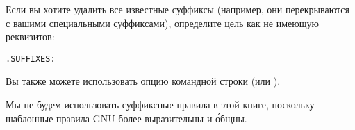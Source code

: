 Если вы хотите удалить все известные суффиксы (например, они
перекрываются с вашими специальными суффиксами), определите цель
 как не имеющую реквизитов:

{\footnotesize
\begin{verbatim}
.SUFFIXES:
\end{verbatim}
}

Вы также можете использовать опцию командной строки
 (или ).

Мы не будем использовать суффиксные правила в этой книге, поскольку
шаблонные правила GNU \GNUmake{} более выразительны и \'{о}бщны.
